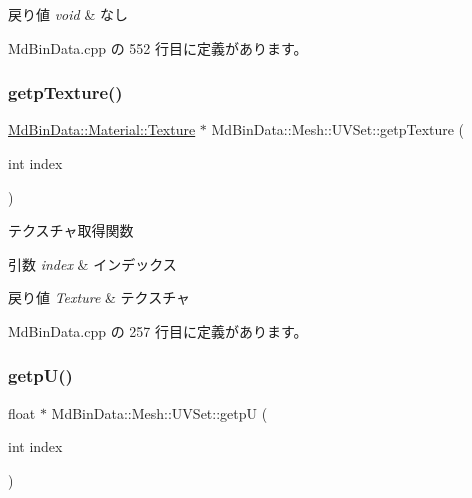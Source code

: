 \begin{DoxyRetVals}{戻り値}
{\em void} & なし \\
\hline
\end{DoxyRetVals}


 Md\+Bin\+Data.\+cpp の 552 行目に定義があります。

\mbox{\label{class_md_bin_data_1_1_mesh_1_1_u_v_set_aa082e3b5e2b3fb9d5a408b0b00ce9d2c}} 
\subsubsection{\texorpdfstring{getp\+Texture()}{getpTexture()}}
{\footnotesize\ttfamily \mbox{\hyperlink{class_md_bin_data_1_1_material_1_1_texture}{Md\+Bin\+Data\+::\+Material\+::\+Texture}} $\ast$ Md\+Bin\+Data\+::\+Mesh\+::\+U\+V\+Set\+::getp\+Texture (\begin{DoxyParamCaption}\item[{int}]{index }\end{DoxyParamCaption})}



テクスチャ取得関数 


\begin{DoxyParams}{引数}
{\em index} & インデックス \\
\hline
\end{DoxyParams}

\begin{DoxyRetVals}{戻り値}
{\em Texture} & テクスチャ \\
\hline
\end{DoxyRetVals}


 Md\+Bin\+Data.\+cpp の 257 行目に定義があります。

\mbox{\label{class_md_bin_data_1_1_mesh_1_1_u_v_set_accaf305a5e973a2538f25f5f95c56e91}} 
\subsubsection{\texorpdfstring{getp\+U()}{getpU()}}
{\footnotesize\ttfamily float $\ast$ Md\+Bin\+Data\+::\+Mesh\+::\+U\+V\+Set\+::getpU (\begin{DoxyParamCaption}\item[{int}]{index }\end{DoxyParamCaption})}




